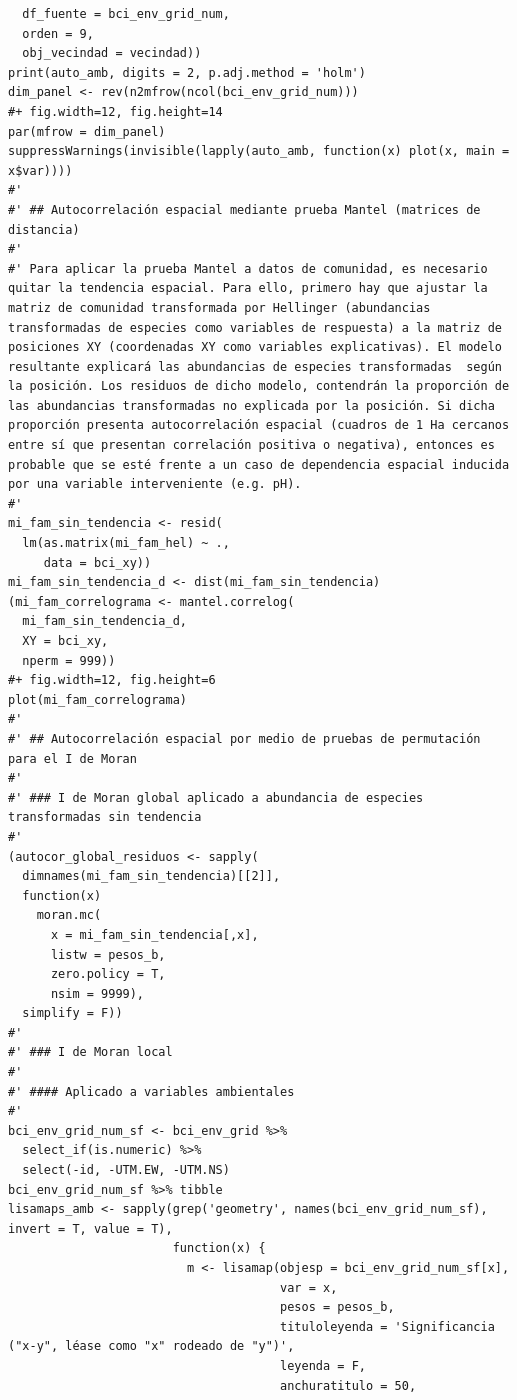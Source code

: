 \documentclass[11pt,]{article}
\begin{document}
\begin{verbatim}
  df_fuente = bci_env_grid_num,
  orden = 9,
  obj_vecindad = vecindad))
print(auto_amb, digits = 2, p.adj.method = 'holm')
dim_panel <- rev(n2mfrow(ncol(bci_env_grid_num)))
#+ fig.width=12, fig.height=14
par(mfrow = dim_panel)
suppressWarnings(invisible(lapply(auto_amb, function(x) plot(x, main = x$var))))
#' 
#' ## Autocorrelación espacial mediante prueba Mantel (matrices de distancia)
#' 
#' Para aplicar la prueba Mantel a datos de comunidad, es necesario quitar la tendencia espacial. Para ello, primero hay que ajustar la matriz de comunidad transformada por Hellinger (abundancias transformadas de especies como variables de respuesta) a la matriz de posiciones XY (coordenadas XY como variables explicativas). El modelo resultante explicará las abundancias de especies transformadas  según la posición. Los residuos de dicho modelo, contendrán la proporción de las abundancias transformadas no explicada por la posición. Si dicha proporción presenta autocorrelación espacial (cuadros de 1 Ha cercanos entre sí que presentan correlación positiva o negativa), entonces es probable que se esté frente a un caso de dependencia espacial inducida por una variable interveniente (e.g. pH).
#' 
mi_fam_sin_tendencia <- resid(
  lm(as.matrix(mi_fam_hel) ~ .,
     data = bci_xy))
mi_fam_sin_tendencia_d <- dist(mi_fam_sin_tendencia)
(mi_fam_correlograma <- mantel.correlog(
  mi_fam_sin_tendencia_d,
  XY = bci_xy,
  nperm = 999))
#+ fig.width=12, fig.height=6
plot(mi_fam_correlograma)
#' 
#' ## Autocorrelación espacial por medio de pruebas de permutación para el I de Moran
#' 
#' ### I de Moran global aplicado a abundancia de especies transformadas sin tendencia
#' 
(autocor_global_residuos <- sapply(
  dimnames(mi_fam_sin_tendencia)[[2]],
  function(x)
    moran.mc(
      x = mi_fam_sin_tendencia[,x],
      listw = pesos_b,
      zero.policy = T,
      nsim = 9999),
  simplify = F))
#' 
#' ### I de Moran local
#' 
#' #### Aplicado a variables ambientales
#' 
bci_env_grid_num_sf <- bci_env_grid %>%
  select_if(is.numeric) %>% 
  select(-id, -UTM.EW, -UTM.NS)
bci_env_grid_num_sf %>% tibble
lisamaps_amb <- sapply(grep('geometry', names(bci_env_grid_num_sf), invert = T, value = T),
                       function(x) {
                         m <- lisamap(objesp = bci_env_grid_num_sf[x],
                                      var = x,
                                      pesos = pesos_b,
                                      tituloleyenda = 'Significancia ("x-y", léase como "x" rodeado de "y")',
                                      leyenda = F,
                                      anchuratitulo = 50,

\end{verbatim}
\end{document}
